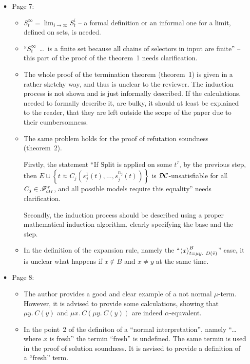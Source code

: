 \begin{itemize}
	\item Page 7:
	\begin{itemize}
		\item $S_t^\infty = \lim_{i \rightarrow \infty} S^i_t$ -- a formal definition or an informal one for a limit, defined on sets, is needed.
		\item ``$S_t^\infty$~\dots~is a finite set because all chains of selectors in input are finite'' -- this part of the proof of the theorem~1 needs clarification.
		
		\item The whole proof of the termination theorem (theorem~1) is given in a rather sketchy way, and thus is unclear to the reviewer. The induction process is not shown and is just informally described. If the calculations, needed to formally describe it, are bulky, it should at least be explained to the reader, that they are left outside the scope of the paper due to their cumbersomness.
		
		\item The same problem holds for the proof of refutation soundness (theorem~2).


		Firstly, the statement ``If $\mathrm{Split}$ is applied on some $t^\tau$, by the previous step, then $E \cup \left\{ t \approx C_j\left( s_j^1(t),\dots,s_j^{n_j}(t) \right) \right\}$ is $\mathcal{DC}$-unsatisfiable for all $C_j \in \mathscr{F}^\tau_{ctr}$, and all possible models require this equality'' needs clarification.


		Secondly, the induction process should be described using a proper mathematical induction algorithm, clearly specifying the base and the step.

		\item In the definition of the expansion rule, namely the ``$\left\langle x \right\rangle^B_{t = \mu y.\ D(\bar{v})}$'' case, it is unclear what happens if $x \notin B$ and $x \ne y$ at the same time.
	\end{itemize}

	\item Page 8:
	\begin{itemize}
		\item The author provides a good and clear example of a not normal $\mu$-term. However, it is advised to provide some calculations, showing that $\mu y.\ C(y)$ and $\mu x.\ C(\mu y.\ C(y))$ are indeed $\alpha$-equvalent.

		\item In the point~2 of the definiton of a ``normal interpretation'', namely ``\dots where $x$ is fresh'' the termin ``fresh'' is undefined. The same termin is used in the proof of solution soundness. It is asvised to provide a definition of a ``fresh'' term.
	\end{itemize}


\end{itemize}
